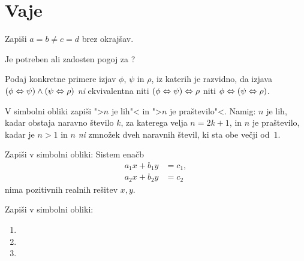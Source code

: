 \section{Vaje}

\begin{vaja}
  Zapiši $a = b \neq c = d$ brez okrajšav.
\end{vaja}

\begin{vaja}
  Je  potreben ali zadosten
  pogoj za ?
\end{vaja}

\begin{vaja}
  Podaj konkretne primere izjav $\phi$, $\psi$ in $\rho$, iz katerih
  je razvidno, da izjava $(\phi \Leftrightarrow \psi) \land (\psi \Leftrightarrow \rho)$
  \emph{ni} ekvivalentna niti $(\phi \Leftrightarrow \psi) \Leftrightarrow \rho$ niti
  $\phi \Leftrightarrow (\psi \Leftrightarrow \rho)$.
\end{vaja}

\begin{vaja}
  V simbolni obliki zapiši ">$n$ je lih"< in ">$n$ je praštevilo"<.
  Namig: $n$ je lih, kadar obstaja naravno število $k$, za katerega
  velja $n = 2 k + 1$, in $n$ je praštevilo, kadar je $n > 1$ in $n$ \emph{ni} zmnožek
  dveh naravnih števil, ki sta obe večji od~$1$.
\end{vaja}

\begin{vaja}
  Zapiši v simbolni obliki: Sistem enačb
  \begin{align*}
    a_1 x + b_1 y &= c_1,\\
    a_2 x + b_2 y &= c_2
  \end{align*}
  nima pozitivnih realnih rešitev $x, y$.
\end{vaja}

\begin{vaja}
  Zapiši v simbolni obliki:
  \begin{enumerate}
  \item {}
  \item {}
  \item {}
  \end{enumerate}
\end{vaja}


